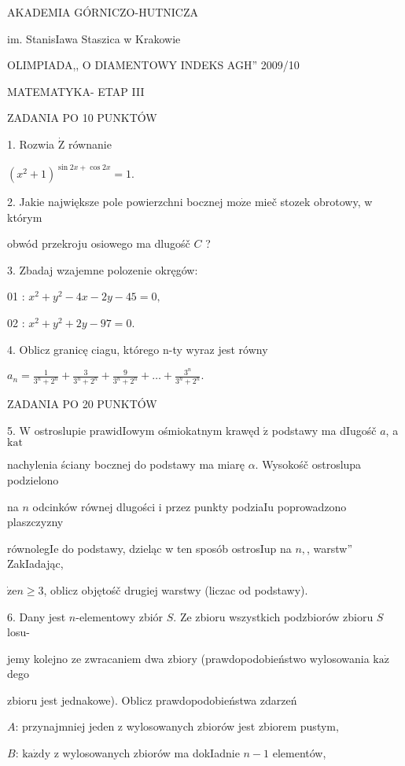 \documentclass[a4paper,12pt]{article}
\begin{document}
AKADEMIA GÓRNICZO-HUTNICZA

im. StanisIawa Staszica w Krakowie

OLIMPIADA,, O DIAMENTOWY INDEKS AGH'' 2009/10

MATEMATYKA- ETAP III

ZADANIA PO 10 PUNKTÓW

1. Rozwia $\dot{\mathrm{Z}}$ równanie

$(x^{2}+1)^{\sin 2x+\cos 2x}=1.$

2. Jakie największe pole powierzchni bocznej $\mathrm{m}\mathrm{o}\dot{\mathrm{z}}\mathrm{e}$ mieč stozek obrotowy, w którym

obwód przekroju osiowego ma dlugośč $C$ ?

3. Zbadaj wzajemne polozenie okręgów:

01 : $x^{2}+y^{2}-4x-2y-45=0,$

02 : $x^{2}+y^{2}+2y-97=0.$

4. Oblicz granicę ciagu, którego n-ty wyraz jest równy

$a_{n}=\displaystyle \frac{1}{3^{n}+2^{n}}+\frac{3}{3^{n}+2^{n}}+\frac{9}{3^{n}+2^{n}}+\ldots+\frac{3^{n}}{3^{n}+2^{n}}.$

ZADANIA PO 20 PUNKTÓW

5. $\mathrm{W}$ ostroslupie prawidIowym ośmiokatnym krawęd $\acute{\mathrm{z}}$ podstawy ma dIugośč $a$, a $\mathrm{k}\mathrm{a}\mathrm{t}$

nachylenia ściany bocznej do podstawy ma miarę $\alpha$. Wysokośč ostroslupa podzielono

na $n$ odcinków równej dlugości i przez punkty podziaIu poprowadzono plaszczyzny

równolegIe do podstawy, dzieląc w ten sposób ostrosIup na $n,$, warstw'' ZakIadając,

$\dot{\mathrm{z}}\mathrm{e}n\geq 3$, oblicz objętośč drugiej warstwy (liczac od podstawy).

6. Dany jest $n$-elementowy zbiór $S$. Ze zbioru wszystkich podzbiorów zbioru $S$ losu-

jemy kolejno ze zwracaniem dwa zbiory (prawdopodobieństwo wylosowania $\mathrm{k}\mathrm{a}\dot{\mathrm{z}}$ dego

zbioru jest jednakowe). Oblicz prawdopodobieństwa zdarzeń

$A$: przynajmniej jeden z wylosowanych zbiorów jest zbiorem pustym,

$B$: $\mathrm{k}\mathrm{a}\dot{\mathrm{z}}\mathrm{d}\mathrm{y}$ z wylosowanych zbiorów ma dokIadnie $n-1$ elementów,
\end{document}
